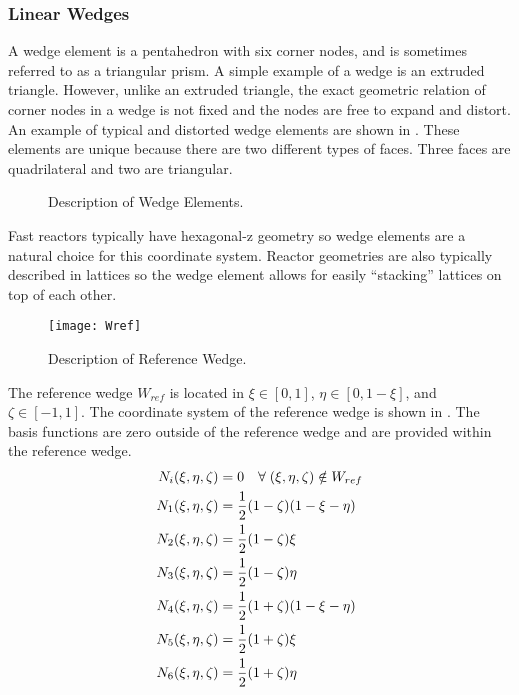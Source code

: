     \subsubsection{Linear Wedges}
      A wedge element is a pentahedron with six corner nodes, and is sometimes
      referred to as a triangular prism. A simple example of a wedge is an
      extruded triangle. However, unlike an extruded triangle, the exact 
      geometric relation of corner nodes in a wedge is not fixed and the nodes 
      are free to expand and distort. An example of typical and distorted
      wedge elements are shown in . These elements are
      unique because there are two different types of faces. Three faces are
      quadrilateral and two are triangular. 

      \begin{figure}
        \centering
        \hspace{0.5in}
        \caption{Description of Wedge Elements.}
        \label{fig:sketch_wedge}
      \end{figure}

      Fast reactors typically have hexagonal-z geometry so wedge elements are a 
      natural choice for this coordinate system. Reactor geometries are also 
      typically described in lattices so the wedge element allows for easily 
      ``stacking'' lattices on top of each other.

      \begin{figure}
        \centering
        \texttt{[image: Wref]}
        \caption{Description of Reference Wedge.}
        \label{fig:Wref}
      \end{figure}

      The reference wedge $W_{ref}$ is located in 
      $\xi \in [0,1]$, $\eta \in [0,1-\xi]$, and $\zeta \in [-1,1]$. The
      coordinate system of the reference wedge is shown in . The
      basis functions are zero outside of the reference wedge and are 
      provided within the reference wedge.
      \begin{align}
        N_i(\xi,\eta,\zeta) &= 0 \quad \forall \; (\xi,\eta,\zeta)
          \notin W_{ref} \\
        N_1(\xi,\eta,\zeta) &= \frac{1}{2} (1-\zeta)(1-\xi-\eta) \\
        N_2(\xi,\eta,\zeta) &= \frac{1}{2} (1-\zeta)\xi \\
        N_3(\xi,\eta,\zeta) &= \frac{1}{2} (1-\zeta)\eta \\
        N_4(\xi,\eta,\zeta) &= \frac{1}{2} (1+\zeta)(1-\xi-\eta) \\
        N_5(\xi,\eta,\zeta) &= \frac{1}{2} (1+\zeta)\xi \\
        N_6(\xi,\eta,\zeta) &= \frac{1}{2} (1+\zeta)\eta 
      \end{align}


